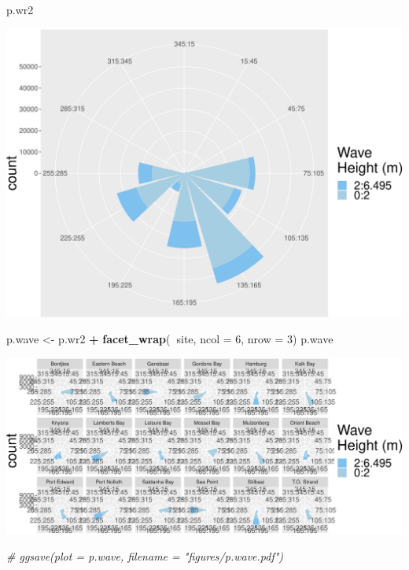 \documentclass[10pt,A4,]{article}
\makeatletter
\newenvironment{Shaded}{\begin{snugshade}}{\end{snugshade}}
\newcommand{\KeywordTok}[1]{\textcolor[rgb]{0.13,0.29,0.53}{\textbf{#1}}}
\newcommand{\DataTypeTok}[1]{\textcolor[rgb]{0.13,0.29,0.53}{#1}}
\newcommand{\DecValTok}[1]{\textcolor[rgb]{0.00,0.00,0.81}{#1}}
\newcommand{\StringTok}[1]{\textcolor[rgb]{0.31,0.60,0.02}{#1}}
\newcommand{\CommentTok}[1]{\textcolor[rgb]{0.56,0.35,0.01}{\textit{#1}}}
\newcommand{\OperatorTok}[1]{\textcolor[rgb]{0.81,0.36,0.00}{\textbf{#1}}}
\newcommand{\NormalTok}[1]{#1}
\def\maxwidth{\ifdim\Gin@nat@width>\linewidth\linewidth
\else\Gin@nat@width\fi}
\let\Oldincludegraphics\includegraphics
\renewcommand{\includegraphics}[1]{\Oldincludegraphics[width=\maxwidth]{#1}}
\makeatother
\begin{document}
\begin{Shaded}
\begin{Highlighting}[]
\NormalTok{p.wr2}
\end{Highlighting}
\end{Shaded}

\includegraphics{appendices_files/figure-latex/Waverose diagram -2.pdf}

\begin{Shaded}
\begin{Highlighting}[]
\NormalTok{p.wave <-}\StringTok{ }\NormalTok{p.wr2 }\OperatorTok{+}\StringTok{ }\KeywordTok{facet_wrap}\NormalTok{(}\OperatorTok{~}\NormalTok{site,}
                            \DataTypeTok{ncol =} \DecValTok{6}\NormalTok{, }\DataTypeTok{nrow =} \DecValTok{3}\NormalTok{)}
\NormalTok{p.wave}
\end{Highlighting}
\end{Shaded}

\includegraphics{appendices_files/figure-latex/Waverose diagram -3.pdf}

\begin{Shaded}
\begin{Highlighting}[]
\CommentTok{# ggsave(plot = p.wave, filename = "figures/p.wave.pdf")}
\end{Highlighting}
\end{Shaded}
\end{document}
